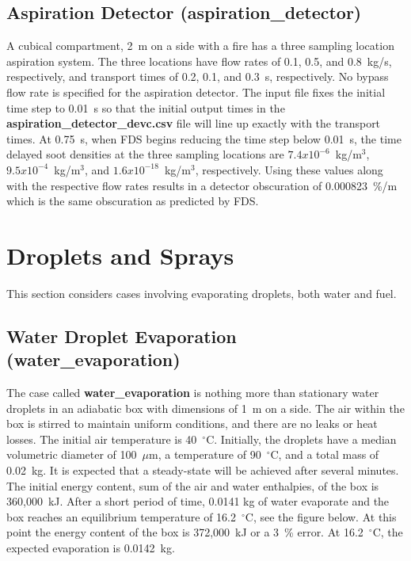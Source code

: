 \documentclass[11pt]{book}
\begin{document}
\subsection{Aspiration Detector ({\bf aspiration\_detector}) }
\label{aspiration_detector}

A cubical compartment, 2~m on a side with a fire has a three sampling location aspiration system.  The three locations
have flow rates of 0.1, 0.5, and 0.8~kg/s, respectively, and transport times of 0.2, 0.1, and 0.3~s, respectively.  No bypass flow rate is
specified for the aspiration detector.  The input file fixes the initial time step to 0.01~s so that the initial output
times in the {\bf aspiration\_detector\_devc.csv} file will line up exactly with the transport times.  At 0.75~s, when
FDS begins reducing the time step below 0.01~s, the time delayed soot densities at the three sampling locations are
$7.4x10^{-6}$~kg/m$^3$, $9.5x10^{-4}$~kg/m$^3$, and $1.6x10^{-18}$~kg/m$^3$, respectively.  Using these values along with the
respective flow rates results in a detector obscuration of 0.000823~\%/m which is the same obscuration as predicted by FDS.

\clearpage

\section{Droplets and Sprays}

This section considers cases involving evaporating droplets, both water and fuel.


\subsection{Water Droplet Evaporation ({\bf water\_evaporation}) }
\label{water_evaporation}

The case called {\bf water\_evaporation} is nothing more than stationary water droplets in an adiabatic box with dimensions of 1~m on a side. The air
within the box is stirred to maintain uniform conditions, and there are no leaks or heat losses. The initial air
 temperature is 40~$^\circ$C.
Initially, the droplets have a median volumetric diameter of 100~$\mu$m, a temperature of 90~$^\circ$C, and a total mass of 0.02~kg.
It is expected that a steady-state will be achieved after several minutes.  The initial energy content, sum of the
air and water enthalpies, of the box is 360,000~kJ.  After a short period of time, 0.0141 kg of water evaporate and the box
reaches an equilibrium temperature of 16.2~$^\circ$C, see the figure below.  At this point the energy content of the box is 372,000~kJ
 or a 3~\% error.  At 16.2~$^\circ$C, the expected evaporation is 0.0142~kg.
\end{document}
